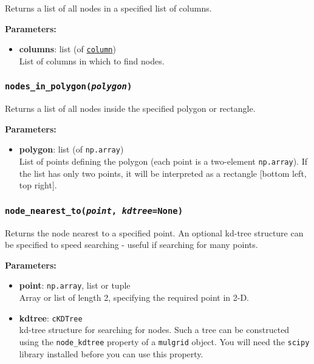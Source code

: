 Returns a list of all nodes in a specified list of columns.

\textbf{Parameters:}
\begin{itemize}
\item \textbf{columns}: list (of \hyperref[columnobjects]{\texttt{column}})\\
  List of columns in which to find nodes.
\end{itemize}

\begin{snugshade}\subsubsection{\texttt{nodes\_in\_polygon(\emph{polygon})}}\end{snugshade}
\label{sec:mulgrid:nodes_in_polygon}

Returns a list of all nodes inside the specified polygon or rectangle.

\textbf{Parameters:}
\begin{itemize}
\item \textbf{polygon}: list (of \texttt{np.array})\\
  List of points defining the polygon (each point is a two-element \texttt{np.array}).  If the list has only two points, it will be interpreted as a rectangle [bottom left, top right].
\end{itemize}

\begin{snugshade}\subsubsection{\texttt{node\_nearest\_to(\emph{point}, \emph{kdtree}=None)}}\end{snugshade}
\label{sec:mulgrid:node_nearest_to}

Returns the node nearest to a specified point.  An optional kd-tree structure can be specified to speed searching - useful if searching for many points.

\textbf{Parameters:}
\begin{itemize}
\item \textbf{point}:  \texttt{np.array}, list or tuple\\
  Array or list of length 2, specifying the required point in 2-D.
\item \textbf{kdtree}:  \texttt{cKDTree}\\
  kd-tree structure for searching for nodes.  Such a tree can be constructed using the \texttt{node\_kdtree} property of a \texttt{mulgrid} object.  You will need the \texttt{scipy} library installed before you can use this property.
\end{itemize}


